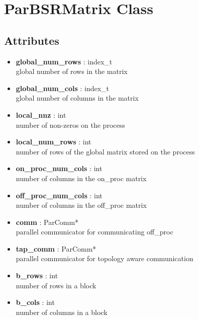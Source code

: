 \documentclass{article}
\newcommand\tab[1][1cm]{\hspace*{#1}}
\begin{document}
\section*{ParBSRMatrix Class}

\subsection*{Attributes}
\begin{itemize}
    \item \textbf{global\_num\_rows} : index\_t \\
        \tab    global number of rows in the matrix
        
    \item \textbf{global\_num\_cols} : index\_t \\
        \tab    global number of columns in the matrix
        
    \item \textbf{local\_nnz} : int \\
        \tab    number of non-zeros on the process
        
    \item \textbf{local\_num\_rows} : int \\
        \tab    number of rows of the global matrix stored on the process
        
    \item \textbf{on\_proc\_num\_cols} : int \\
        \tab    number of columns in the on\_proc matrix
        
    \item \textbf{off\_proc\_num\_cols} : int \\
        \tab    number of columns in the off\_proc matrix
        
    \item \textbf{comm} : ParComm* \\
        \tab    parallel communicator for communicating off\_proc
        
    \item \textbf{tap\_comm} : ParComm* \\
        \tab    parallel communicator for topology aware communication
        
    \item \textbf{b\_rows} : int \\
        \tab    number of rows in a block
        
    \item \textbf{b\_cols} : int \\
        \tab    number of columns in a block
        

\end{itemize}
\end{document}
